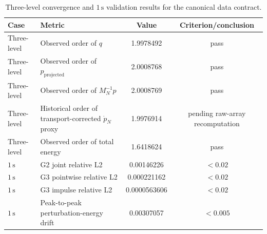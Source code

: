 \begin{table}[htbp]
\centering
\caption{Three-level convergence and \(1\,\mathrm{s}\) validation results for the canonical data contract.}
\label{tab:canonical-time-step}
\scriptsize
\begin{tabularx}{\textwidth}{@{}l>{\raggedright\arraybackslash}Xcc@{}}
\toprule
Case & Metric & Value & Criterion/conclusion \\
\midrule
Three-level & Observed order of \(q\) & 1.9978492 & pass \\
Three-level & Observed order of \(p_{\mathrm{projected}}\) & 2.0008768 & pass \\
Three-level & Observed order of \(M_N^{-1}p\) & 2.0008769 & pass \\
Three-level & Historical order of transport-corrected \(\dot p_N\) proxy & 1.9976914 & pending raw-array recomputation \\
Three-level & Observed order of total energy & 1.6418624 & pass \\
\midrule
\(1\,\mathrm{s}\) & G2 joint relative L2 & 0.00146226 & \(<0.02\) \\
\(1\,\mathrm{s}\) & G3 pointwise relative L2 & 0.000221162 & \(<0.02\) \\
\(1\,\mathrm{s}\) & G3 impulse relative L2 & 0.0000563606 & \(<0.02\) \\
\(1\,\mathrm{s}\) & Peak-to-peak perturbation-energy drift & 0.00307057 & \(<0.005\) \\
\bottomrule
\end{tabularx}
\end{table}
